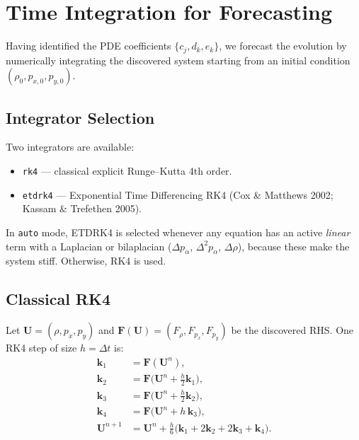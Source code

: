 \documentclass[11pt, letterpaper]{article}
\theoremstyle{definition}
\newcommand{\lap}{\Delta}
\newcommand{\bilap}{\Delta^{2}}
\begin{document}
\section{Time Integration for Forecasting}
\label{sec:integrators}

Having identified the PDE coefficients $\{c_j, d_k, e_k\}$, we
forecast the evolution by numerically integrating the discovered
system starting from an initial condition
$(\rho_0, p_{x,0}, p_{y,0})$.

\subsection{Integrator Selection}
\label{sec:integrator-select}

Two integrators are available:
\begin{itemize}[nosep]
  \item \texttt{rk4} --- classical explicit Runge--Kutta 4th order.
  \item \texttt{etdrk4} --- Exponential Time Differencing RK4
    (Cox \& Matthews 2002; Kassam \& Trefethen 2005).
\end{itemize}
In \texttt{auto} mode, ETDRK4 is selected whenever any equation has
an active \emph{linear} term with a Laplacian or bilaplacian
($\lap p_\alpha$, $\bilap p_\alpha$, $\lap\rho$), because these
make the system stiff.  Otherwise, RK4 is used.

\subsection{Classical RK4}
\label{sec:rk4}

Let $\mathbf{U} = (\rho, p_x, p_y)$ and
$\mathbf{F}(\mathbf{U}) = (F_\rho, F_{p_x}, F_{p_y})$ be the
discovered RHS.  One RK4 step of size $h = \Delta t$ is:
\begin{align}
  \mathbf{k}_1 &= \mathbf{F}(\mathbf{U}^n), \nonumber\\
  \mathbf{k}_2 &= \mathbf{F}\!\bigl(\mathbf{U}^n + \tfrac{h}{2}\mathbf{k}_1\bigr), \nonumber\\
  \mathbf{k}_3 &= \mathbf{F}\!\bigl(\mathbf{U}^n + \tfrac{h}{2}\mathbf{k}_2\bigr), \nonumber\\
  \mathbf{k}_4 &= \mathbf{F}\!\bigl(\mathbf{U}^n + h\,\mathbf{k}_3\bigr), \nonumber\\
  \mathbf{U}^{n+1}
    &= \mathbf{U}^n + \frac{h}{6}\bigl(\mathbf{k}_1 + 2\mathbf{k}_2 + 2\mathbf{k}_3 + \mathbf{k}_4\bigr).
\label{eq:rk4}
\end{align}
\end{document}
